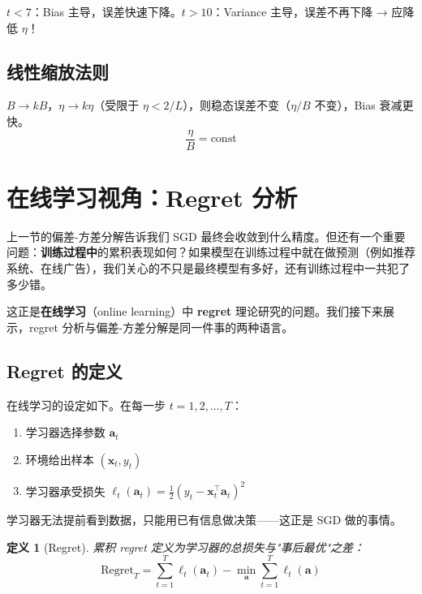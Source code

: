 \documentclass[12pt, a4paper]{ctexart}
\newtheorem{definition}[theorem]{定义}
\begin{document}
$t < 7$：Bias 主导，误差快速下降。$t > 10$：Variance 主导，误差不再下降 → 应降低 $\eta$！

\subsection{线性缩放法则}

\begin{keypoint}
$B \to kB$，$\eta \to k\eta$（受限于 $\eta < 2/L$），则稳态误差不变（$\eta/B$ 不变），Bias 衰减更快。
\[
\boxed{\frac{\eta}{B} = \mathrm{const}}
\]
\end{keypoint}


\section{在线学习视角：Regret 分析}

上一节的偏差-方差分解告诉我们 SGD 最终会收敛到什么精度。但还有一个重要问题：\textbf{训练过程中}的累积表现如何？如果模型在训练过程中就在做预测（例如推荐系统、在线广告），我们关心的不只是最终模型有多好，还有训练过程中一共犯了多少错。

这正是\textbf{在线学习}（online learning）中 \textbf{regret} 理论研究的问题。我们接下来展示，regret 分析与偏差-方差分解是同一件事的两种语言。

\subsection{Regret 的定义}

在线学习的设定如下。在每一步 $t = 1, 2, \ldots, T$：
\begin{enumerate}
    \item 学习器选择参数 $\mathbf{a}_t$
    \item 环境给出样本 $(\mathbf{x}_t, y_t)$
    \item 学习器承受损失 $\ell_t(\mathbf{a}_t) = \frac{1}{2}(y_t - \mathbf{x}_t^\top \mathbf{a}_t)^2$
\end{enumerate}

学习器无法提前看到数据，只能用已有信息做决策——这正是 SGD 做的事情。

\begin{definition}[Regret]
累积 regret 定义为学习器的总损失与"事后最优"之差：
\begin{equation}
    \mathrm{Regret}_T = \sum_{t=1}^T \ell_t(\mathbf{a}_t) - \min_{\mathbf{a}} \sum_{t=1}^T \ell_t(\mathbf{a})
\end{equation}
\end{definition}
\end{document}
